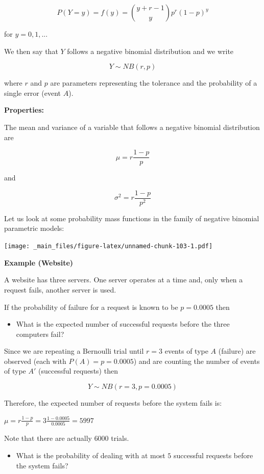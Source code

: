 \documentclass[
]{book}
\providecommand{\tightlist}{%
  \setlength{\itemsep}{0pt}\setlength{\parskip}{0pt}}
\begin{document}
\[P(Y=y)=f(y)=\binom {y+r-1} y p^r(1-p)^y\]

for \(y=0,1,...\)

We then say that \(Y\) follows a negative binomial distribution and we write

\[Y\sim NB(r,p)\]

where \(r\) and \(p\) are parameters representing the tolerance and the probability of a single error (event \(A\)).

\textbf{Properties:}

The mean and variance of a variable that follows a negative binomial distribution are

\[\mu
= r\frac{1-p}{p}\]

and

\[\sigma^2= r\frac{1-p}{p^2}\]

Let us look at some probability mass functions in the family of negative binomial parametric models:

\texttt{[image: \_main\_files/figure-latex/unnamed-chunk-103-1.pdf]}

\textbf{Example (Website)}

A website has three servers. One server operates at a time and, only when a request fails, another server is used.

If the probability of failure for a request is known to be \(p=0.0005\) then

\begin{itemize}
\tightlist
\item
  What is the expected number of successful requests before the three computers fail?
\end{itemize}

Since we are repeating a Bernoulli trial until \(r=3\) events of type \(A\) (failure) are observed (each with \(P(A)=p=0.0005\)) and are counting the number of events of type \(A'\) (successful requests) then

\[Y \sim NB(r=3, p=0.0005)\]

Therefore, the expected number of requests before the system fails is:

\(\mu=r\frac{1-p}{p}=3\frac{1-0.0005}{0.0005}=5997\)

Note that there are actually \(6000\) trials.

\begin{itemize}
\tightlist
\item
  What is the probability of dealing with at most \(5\) successful requests before the system fails?
\end{itemize}
\end{document}
